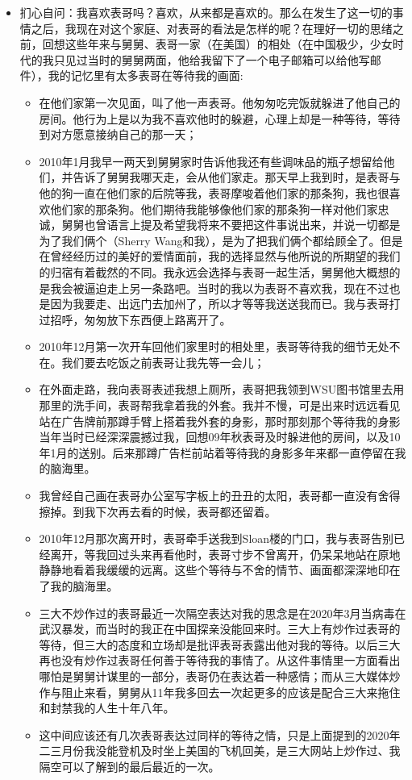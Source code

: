 \documentclass[9pt, b5paper]{article}
\begin{document}
\begin{itemize}
\item 扪心自问：我喜欢表哥吗？喜欢，从来都是喜欢的。那么在发生了这一切的事情之后，我现在对这个家庭、对表哥的看法是怎样的呢？在理好一切的思绪之前，回想这些年来与舅舅、表哥一家（在美国）的相处（在中国极少，少女时代的我只见过当时的舅舅两面，他给我留下了一个电子邮箱可以给他写邮件），我的记忆里有太多表哥在等待我的画面:
\begin{itemize}
\item 在他们家第一次见面，叫了他一声表哥。他匆匆吃完饭就躲进了他自己的房间。他行为上是以为我不喜欢他时的躲避，心理上却是一种等待，等待到对方愿意接纳自己的那一天；
\item 2010年1月我早一两天到舅舅家时告诉他我还有些调味品的瓶子想留给他们，并告诉了舅舅我哪天走，会从他们家走。那天早上我到时，是表哥与他的狗一直在他们家的后院等我，表哥摩唆着他们家的那条狗，我也很喜欢他们家的那条狗。他们期待我能够像他们家的那条狗一样对他们家忠诚，舅舅也曾语言上提及希望我将来不要把这件事说出来，并说一切都是为了我们俩个（Sherry Wang和我），是为了把我们俩个都给顾全了。但是在曾经经历过的美好的爱情面前，我的选择显然与他所说的所期望的我们的归宿有着截然的不同。我永远会选择与表哥一起生活，舅舅他大概想的是我会被逼迫走上另一条路吧。当时的我以为表哥不喜欢我，现在不过也是因为我要走、出远门去加州了，所以才等等我送送我而已。我与表哥打过招呼，匆匆放下东西便上路离开了。
\item 2010年12月第一次开车回他们家里时的相处里，表哥等待我的细节无处不在。我们要去吃饭之前表哥让我先等一会儿；
\item 在外面走路，我向表哥表述我想上厕所，表哥把我领到WSU图书馆里去用那里的洗手间，表哥帮我拿着我的外套。我并不慢，可是出来时远远看见站在广告牌前那蹲手臂上搭着我外套的身影，那时那刻那个等待我的身影当年当时已经深深震撼过我，回想09年秋表哥及时躲进他的房间，以及10年1月的送别。后来那蹲广告栏前站着等待我的身影多年来都一直停留在我的脑海里。
\item 我曾经自己画在表哥办公室写字板上的丑丑的太阳，表哥都一直没有舍得擦掉。到我下次再去看的时候，表哥都还留着。
\item 2010年12月那次离开时，表哥牵手送我到Sloan楼的门口，我与表哥告别已经离开，等我回过头来再看他时，表哥寸步不曾离开，仍呆呆地站在原地静静地看着我缓缓的远离。这些个等待与不舍的情节、画面都深深地印在了我的脑海里。
\item 三大不炒作过的表哥最近一次隔空表达对我的思念是在2020年3月当病毒在武汉暴发，而当时的我正在中国探亲没能回来时。三大上有炒作过表哥的等待，但三大的态度和立场却是批评表哥表露出他对我的等待。以后三大再也没有炒作过表哥任何善于等待我的事情了。从这件事情里一方面看出哪怕是舅舅计谋里的一部分，表哥仍在表达着一种感情；而从三大媒体炒作与阻止来看，舅舅从11年我多回去一次起更多的应该是配合三大来拖住和封禁我的人生十年八年。
\item 这中间应该还有几次表哥表达过同样的等待之情，只是上面提到的2020年二三月份我没能登机及时坐上美国的飞机回美，是三大网站上炒作过、我隔空可以了解到的最后最近的一次。
\end{itemize}
\end{itemize}
\end{document}
